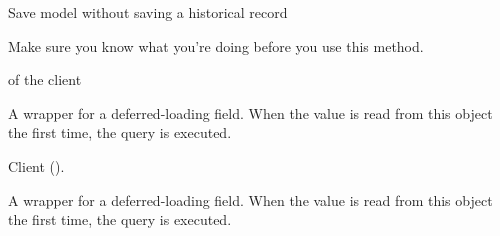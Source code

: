 \documentclass[letterpaper,10pt,english]{sphinxmanual}
\begin{document}
\begin{fulllineitems}
\begin{fulllineitems}
\label{\detokenize{modules/models:users.models.Profile.save_without_historical_record}}
Save model without saving a historical record

Make sure you know what you’re doing before you use this method.

\end{fulllineitems}


\begin{fulllineitems}
\label{\detokenize{modules/models:users.models.Profile.school}}
{\hyperref[\detokenize{modules/models:users.models.School}]{}} of the client

\end{fulllineitems}


\begin{fulllineitems}
\label{\detokenize{modules/models:users.models.Profile.school_id}}
A wrapper for a deferred-loading field. When the value is read from this
object the first time, the query is executed.

\end{fulllineitems}


\begin{fulllineitems}
\label{\detokenize{modules/models:users.models.Profile.user}}
Client ().

\end{fulllineitems}


\begin{fulllineitems}
\label{\detokenize{modules/models:users.models.Profile.user_id}}
A wrapper for a deferred-loading field. When the value is read from this
object the first time, the query is executed.

\end{fulllineitems}


\end{fulllineitems}
\end{document}
